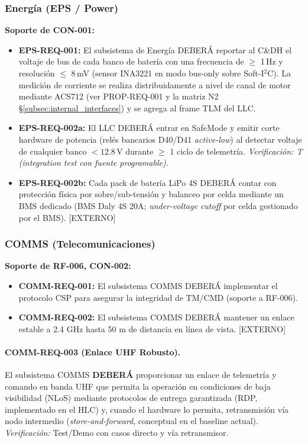 \subsubsection{Energía (EPS / Power)}
\textbf{Soporte de CON-001:}
\begin{itemize}
    \item \textbf{EPS-REQ-001:} El subsistema de Energía DEBERÁ reportar al C\&DH el voltaje de bus de cada banco de batería con una frecuencia de $\ge$ 1\,Hz y resolución $\le$ 8\,mV (sensor INA3221 en modo bus-only sobre Soft-I$^2$C). La medición de corriente se realiza distribuidamente a nivel de canal de motor mediante ACS712 (ver PROP-REQ-001 y la matriz N2 \S\ref{subsec:internal_interfaces}) y se agrega al frame TLM del LLC.
    \item \textbf{EPS-REQ-002a:} El LLC DEBERÁ entrar en SafeMode y emitir corte hardware de potencia (relés bancarios D40/D41 \emph{active-low}) al detectar voltaje de cualquier banco $< 12.8\,$V durante $\ge$ 1 ciclo de telemetría. \emph{Verificación: T (integration test con fuente programable).}
    \item \textbf{EPS-REQ-002b:} Cada pack de batería LiPo 4S DEBERÁ contar con protección física por sobre/sub-tensión y balanceo por celda mediante un BMS dedicado (BMS Daly 4S 20A; \emph{under-voltage cutoff} por celda gestionado por el BMS). [EXTERNO]
\end{itemize}

\subsubsection{COMMS (Telecomunicaciones)}
\textbf{Soporte de RF-006, CON-002:}
\begin{itemize}
    \item \textbf{COMM-REQ-001:} El subsistema COMMS DEBERÁ implementar el protocolo CSP para asegurar la integridad de TM/CMD (soporte a RF-006).
    \item \textbf{COMM-REQ-002:} El subsistema COMMS DEBERÁ mantener un enlace estable a 2.4 GHz hasta 50 m de distancia en línea de vista. [EXTERNO]
\end{itemize}

\paragraph{COMM-REQ-003 (Enlace UHF Robusto).}
El subsistema COMMS \textbf{DEBERÁ} proporcionar un enlace de telemetría y comando en banda UHF que permita la operación en condiciones de baja visibilidad (NLoS) mediante protocolos de entrega garantizada (RDP, implementado en el HLC) y, cuando el hardware lo permita, retransmisión vía nodo intermedio (\emph{store-and-forward}, conceptual en el baseline actual). \\
\textit{Verificación:} Test/Demo con casos directo y vía retransmisor.

